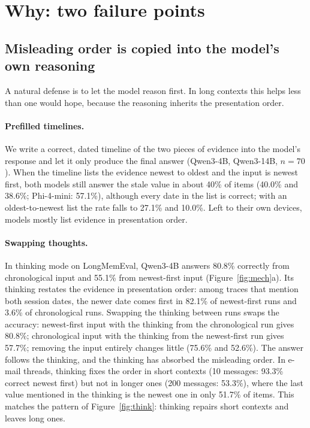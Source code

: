 \documentclass[11pt]{article}
\begin{document}
\section{Why: two failure points}
\label{sec:mechanism}

\subsection{Misleading order is copied into the model's own reasoning}
\label{sec:copy}
A natural defense is to let the model reason first. In long contexts this helps less than one would hope, because the reasoning inherits the presentation order.

\paragraph{Prefilled timelines.}
We write a correct, dated timeline of the two pieces of evidence into the model's response and let it only produce the final answer (Qwen3-4B, Qwen3-14B, $n=70$).
When the timeline lists the evidence newest to oldest and the input is newest first, both models still answer the stale value in about 40\% of items (40.0\% and 38.6\%; Phi-4-mini: 57.1\%), although every date in the list is correct; with an oldest-to-newest list the rate falls to 27.1\% and 10.0\%. Left to their own devices, models mostly list evidence in presentation order.

\paragraph{Swapping thoughts.}
In thinking mode on LongMemEval, Qwen3-4B answers 80.8\% correctly from chronological input and 55.1\% from newest-first input (Figure~\ref{fig:mech}a).
Its thinking restates the evidence in presentation order: among traces that mention both session dates, the newer date comes first in 82.1\% of newest-first runs and 3.6\% of chronological runs.
Swapping the thinking between runs swaps the accuracy: newest-first input with the thinking from the chronological run gives 80.8\%; chronological input with the thinking from the newest-first run gives 57.7\%; removing the input entirely changes little (75.6\% and 52.6\%).
The answer follows the thinking, and the thinking has absorbed the misleading order.
In e-mail threads, thinking fixes the order in short contexts (10 messages: 93.3\% correct newest first) but not in longer ones (200 messages: 53.3\%), where the last value mentioned in the thinking is the newest one in only 51.7\% of items. This matches the pattern of Figure~\ref{fig:think}: thinking repairs short contexts and leaves long ones.
\end{document}
